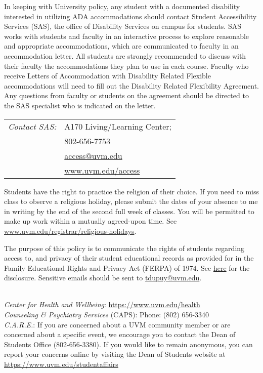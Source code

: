 \documentclass[11pt, letterpaper]{article}
\theoremstyle{definition}
\theoremstyle{remark}
\begin{document}
 In keeping with University policy, any student with a documented disability interested in utilizing ADA accommodations should contact Student Accessibility Services (SAS), the office of Disability Services on campus for students. SAS works with students and faculty in an interactive process to explore reasonable and appropriate accommodations, which are communicated to faculty in an accommodation letter. All students are strongly recommended to discuss with their faculty the accommodations they plan to use in each course. Faculty who receive Letters of Accommodation with Disability Related Flexible accommodations will need to fill out the Disability Related Flexibility Agreement. Any questions from faculty or students on the agreement should be directed to the SAS specialist who is indicated on the letter. 
\begin{tabular}{ll}
{\em Contact SAS:} &A170 Living/Learning Center; \\
&802-656-7753 \\ 
&\href{mailto:access@uvm.edu}{access@uvm.edu} \\
&\href{https://www.uvm.edu/access}{www.uvm.edu/access}
\end{tabular}

\vspace{1em}

 Students have the right to practice the religion of their choice. If you need to miss class to observe a religious holiday, please submit the dates of your absence to me in writing by the end of the second full week of classes. You will be permitted to make up work within a mutually agreed-upon time. See \href{https://www.uvm.edu/registrar/religious-holidays}{www.uvm.edu/registrar/religious-holidays}.
\vspace{1em}

 The purpose of this policy is to communicate the rights of students regarding access to, and privacy of their student educational records as provided for in the Family Educational Rights and Privacy Act (FERPA) of 1974. See \href{http://catalogue.uvm.edu/undergraduate/academicinfo/ferparightsdisclosure/}{here} for the disclosure.
Sensitive emails should be sent to \href{mailto:tdupuy@uvm.edu}{tdupuy@uvm.edu}.
\vspace{1em}

 \\
{\em Center for Health and Wellbeing}:
\url{https://www.uvm.edu/health} \\
{\em Counseling \& Psychiatry Services} (CAPS):
Phone: (802) 656-3340 \\
{\em C.A.R.E.}: If you are concerned about a UVM community member or are concerned about a specific event, we encourage you to contact the Dean of Students Office (802-656-3380).  If you would like to remain anonymous, you can report your concerns online by visiting the Dean of Students website at \url{https://www.uvm.edu/studentaffairs}
\vspace{1em}
\end{document}
